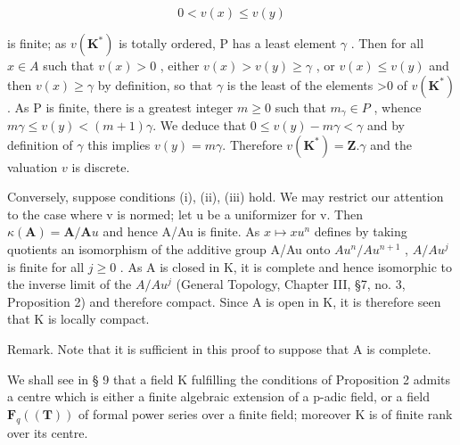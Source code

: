 \[
0 <   v (x) \leqslant v (y)
\]

is finite; as \(v(\mathbf{K}^{*})\) is totally ordered, P has a least element \(\gamma\) . Then for all \(x \in A\) such that \(v(x) > 0\) , either \(v(x) > v(y) \geqslant \gamma\) , or \(v(x) \leqslant v(y)\) and then \(v(x) \geqslant \gamma\) by definition, so that \(\gamma\) is the least of the elements >0 of \(v(\mathbf{K}^{*})\) . As P is finite, there is a greatest integer \(m \geqslant 0\) such that \(m_{\gamma} \in P\) , whence \(m\gamma \leqslant v(y) < (m + 1)\gamma.\) We deduce that \(0 \leqslant v(y) - m\gamma < \gamma\) and by definition of \(\gamma\) this implies \(v(y) = m\gamma.\) Therefore \(v(\mathbf{K}^{*}) = \mathbf{Z}. \gamma\) and the valuation \(v\) is discrete.

Conversely, suppose conditions (i), (ii), (iii) hold. We may restrict our attention to the case where v is normed; let u be a uniformizer for v. Then \(\kappa(\mathbf{A}) = \mathbf{A}/\mathbf{A}u\) and hence A/Au is finite. As \(x \mapsto xu^{n}\) defines by taking quotients an isomorphism of the additive group A/Au onto \(Au^{n}/Au^{n+1}\) , \(A/Au^{j}\) is finite for all \(j \geqslant 0\) . As A is closed in K, it is complete and hence isomorphic to the inverse limit of the \(A/Au^{j}\) (General Topology, Chapter III, §7, no. 3, Proposition 2) and therefore compact. Since A is open in K, it is therefore seen that K is locally compact.

Remark. Note that it is sufficient in this proof to suppose that A is complete.

We shall see in § 9 that a field K fulfilling the conditions of Proposition 2 admits a centre which is either a finite algebraic extension of a p-adic field, or a field \(\mathbf{F}_{q}((\mathbf{T}))\) of formal power series over a finite field; moreover K is of finite rank over its centre.


